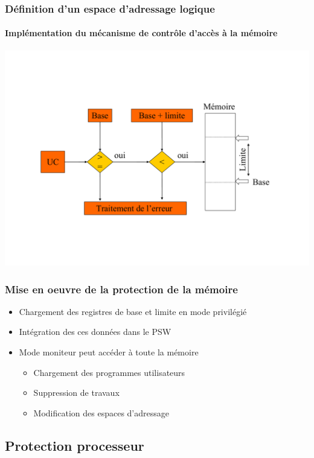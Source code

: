 \begin{frame}
 \frametitle{Définition d’un espace d’adressage logique}
 \framesubtitle{Implémentation du mécanisme de contrôle d'accès à la mémoire}
 \includegraphics[width=\textwidth]{../illustration/protect_memoire_base_implementation.pdf}
\end{frame}

\begin{frame}
 \frametitle{Mise en oeuvre de la protection de la mémoire}
 \begin{itemize}
 \item Chargement des registres de base et limite en mode privilégié
 \item Intégration des ces données dans le PSW
 \item Mode moniteur peut accéder à toute la mémoire
 \begin{itemize}
 \item Chargement des programmes utilisateurs
 \item Suppression de travaux
 \item Modification des espaces d’adressage
 \end{itemize}
 \end{itemize}
\end{frame}



\subsection{Protection processeur}


